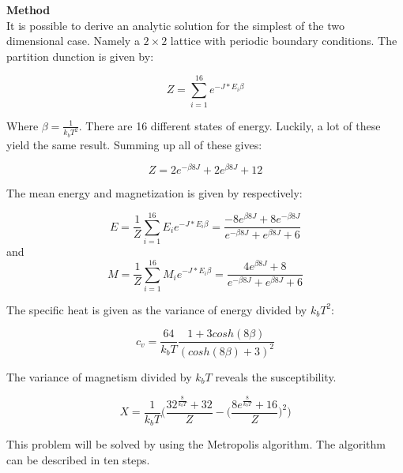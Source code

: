 \documentclass[10pt,a4paper]{article}
\begin{document}
{\LARGE\bf
Method
}\\

\noindent It is possible to derive an analytic solution for the simplest of the two dimensional case. Namely a $2 \times 2$ lattice with periodic boundary conditions. The partition dunction is given by:

\begin{equation}
Z= \sum\limits_{i=1}^{16}  e^{-J*E_{i}\beta}
\end{equation}

\noindent Where $\beta= \frac{1}{k_b T^2}$.  There are 16 different states of energy. Luckily, a lot of these yield the same result. Summing up all of these gives:

\begin{equation}
Z=2e^{-\beta 8 J}+2e^{\beta 8 J}+12
\end{equation}

\noindent The mean energy and magnetization is given by respectively:

\begin{equation}
E=\frac{1}{Z} \sum\limits_{i=1}^{16}  E_{i}e^{-J*E_{i}\beta}=\frac{-8e^{\beta 8J }+8e^{-\beta 8J}}{e^{-\beta 8 J}+e^{\beta 8 J}+6}
\end{equation}
and
\begin{equation}
M=\frac{1}{Z}\sum\limits_{i=1}^{16}  M_{i}e^{-J*E_{i}\beta}=\frac{4e^{\beta 8J}+8}{e^{-\beta 8 J}+e^{\beta 8 J}+6}
\end{equation}

\noindent The specific heat is given as the variance of energy divided by $k_b T^2$:

\begin{equation} 
c_v =\frac{64}{k_b T} \frac{1+3cosh(8\beta)}{(cosh(8\beta)+3)^2}
\end{equation}

\noindent The variance of magnetism divided by $k_b T$ reveals the susceptibility.

\begin{equation}
X=\frac{1}{k_b T} \Bigg(\frac{32^{\frac{8}{k_b T}}+32}{Z} - \Big(\frac{8e^{\frac{8}{k_b T}}+16}{Z}\Big)^2\Bigg)
\end{equation}

\noindent This problem will be solved by using the Metropolis algorithm. The algorithm can be described in ten steps. 
\end{document}
